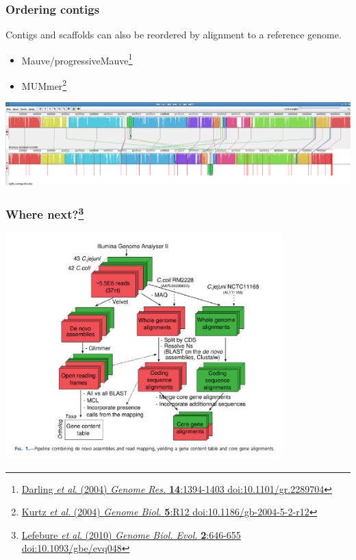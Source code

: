 \begin{frame}
  \frametitle{Ordering contigs}
  Contigs and scaffolds can also be reordered by alignment to a reference genome.\\
  \begin{itemize}
    \item Mauve/progressiveMauve\footnote{\tiny{\href{http://dx.doi.org/10.1101/gr.2289704}{Darling \textit{et al}. (2004) \textit{Genome Res.} \textbf{14}:1394-1403 doi:10.1101/gr.2289704}}}
    \item MUMmer\footnote{\tiny{\href{http://dx.doi.org/10.1186/gb-2004-5-2-r12}{Kurtz \textit{et al}. (2004) \textit{Genome Biol.} \textbf{5}:R12 doi:10.1186/gb-2004-5-2-r12}}}
  \end{itemize}
  \begin{center}
    \includegraphics[width=1\textwidth]{images/mauve_output}
  \end{center}    
\end{frame}

\begin{frame}
  \frametitle{Where next?\footnote{\tiny{\href{http://dx.doi.org/10.1093/gbe/evq048}{Lefebure \textit{et al}. (2010) \textit{Genome Biol. Evol.} \textbf{2}:646-655 doi:10.1093/gbe/evq048}}}}
  \begin{center}
    \includegraphics[width=0.8\textwidth]{images/genome_analysis_pipeline}
  \end{center}    
\end{frame}
